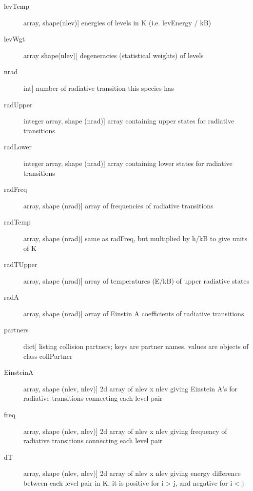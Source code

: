 \documentclass[letterpaper,10pt,english]{sphinxmanual}
\begin{document}
\begin{fulllineitems}
\begin{description}
\begin{description}
\item[{levTemp}] \leavevmode{[}array, shape(nlev){]}
energies of levels in K (i.e. levEnergy / kB)

\item[{levWgt}] \leavevmode{[}array shape(nlev){]}
degeneracies (statistical weights) of levels

\item[{nrad}] \leavevmode{[}int{]}
number of radiative transition this species has

\item[{radUpper}] \leavevmode{[}integer array, shape (nrad){]}
array containing upper states for radiative transitions

\item[{radLower}] \leavevmode{[}integer array, shape (nrad){]}
array containing lower states for radiative transitions

\item[{radFreq}] \leavevmode{[}array, shape (nrad){]}
array of frequencies of radiative transitions

\item[{radTemp}] \leavevmode{[}array, shape (nrad){]}
same as radFreq, but multiplied by h/kB to give units of K

\item[{radTUpper}] \leavevmode{[}array, shape (nrad){]}
array of temperatures (E/kB) of upper radiative states

\item[{radA}] \leavevmode{[}array, shape (nrad){]}
array of Einstin A coefficients of radiative transitions

\item[{partners}] \leavevmode{[}dict{]}
listing collision partners; keys are partner names, values are
objects of class collPartner

\item[{EinsteinA}] \leavevmode{[}array, shape (nlev, nlev){]}
2d array of nlev x nlev giving Einstein A's for radiative
transitions connecting each level pair

\item[{freq}] \leavevmode{[}array, shape (nlev, nlev){]}
2d array of nlev x nlev giving frequency of radiative
transitions connecting each level pair

\item[{dT}] \leavevmode{[}array, shape (nlev, nlev){]}
2d array of nlev x nlev giving energy difference between each
level pair in K; it is positive for i \textgreater{} j, and negative for i
\textless{} j


\end{description}
\end{description}
\end{fulllineitems}
\end{document}
